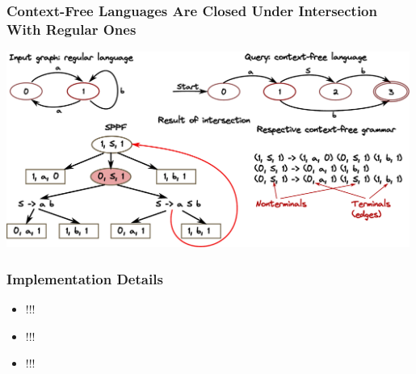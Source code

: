 \documentclass[xcolor=table,aspectratio=169]{beamer}
\newcommand{\nodeDistanceRsm}{2.5cm}
\begin{document}
\begin{frame}[fragile] \frametitle{Context-Free Languages Are Closed Under Intersection With Regular Ones}
  \begin{center}
      \includegraphics[width=0.99\textwidth]{pictures/Intersection.pdf}
  \end{center}
\end{frame}


%
%
%




\begin{frame}[fragile] \frametitle{Implementation Details}
  \begin{itemize}
  \item !!!
  \item !!!
  \item !!!
  \end{itemize}

\end{frame}
\end{document}
